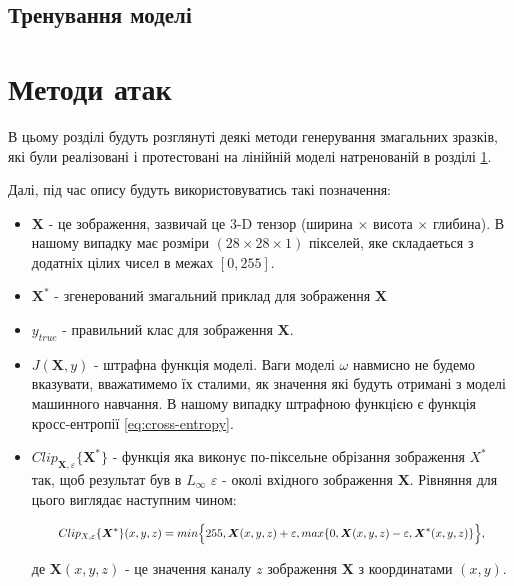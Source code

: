 \documentclass[a4paper,14pt]{extreport}
\begin{document}
	\section{Тренування моделі}
	
	
	
	
	\label{sec:model}
	
	\chapter{Методи атак}
	В цьому розділі будуть розглянуті деякі методи генерування змагальних зразків, які були реалізовані і протестовані на лінійній моделі натренованій в розділі \ref{sec:model}.
	
	Далі, під час опису будуть використовуватись такі позначення:
	\begin{itemize}
		\item $\boldsymbol{X}$ - це зображення, зазвичай це 3-D тензор (ширина $\times$ висота $\times$ глибина). В нашому випадку має розміри $(28 \times 28 \times 1)$ пікселей, яке складаеться з додатніх цілих чисел в межах $[0, 255]$.
		\item $\boldsymbol{X}^{*}$ - згенерований змагальний приклад для зображення $\boldsymbol{X}$
		\item $y_{true}$ - правильний клас для зображення $\boldsymbol{X}$.
		\item $J(\boldsymbol{X}, y)$ - штрафна функція моделі. Ваги моделі $\omega$ навмисно не будемо вказувати, вважатимемо їх сталими, як значення які будуть отримані з моделі машинного навчання. В нашому випадку штрафною функцією є функція кросс-ентропії \ref{eq:cross-entropy}. 
		\item $Clip_{\boldsymbol{X}, \varepsilon} \{ \boldsymbol{X}^{*} \}$ - функція яка виконує по-піксельне обрізання зображення $X^{*}$ так, щоб результат був в $L_{\infty}$ $\varepsilon $ - околі вхідного зображення $\boldsymbol{X}$. Рівняння для цього виглядає наступним чином:
		
		\begingroup
		\setlength{\abovedisplayskip}{0pt}
		\setlength{\belowdisplayskip}{0pt}
		\begin{align}
		\label{eq:clip}
		\resizebox{.9 \textwidth}{!} 
		{
			$
			Clip_{X, \varepsilon} \{ \boldsymbol{X}^{*} \}(x, y, z) = 
			min\Big\{ 255, \boldsymbol{X}(x, y, z) + \varepsilon, max \{ 0, \boldsymbol{X}(x, y, z) - \varepsilon, \boldsymbol{X}^{*}(x, y, z) \} \Big\}
			$,
		}
		\end{align}
		\endgroup

		де $\boldsymbol{X}(x, y, z)$ - це значення каналу $z$ зображення $\boldsymbol{X}$ з координатами $(x, y)$.
	\end{itemize}
\end{document}
